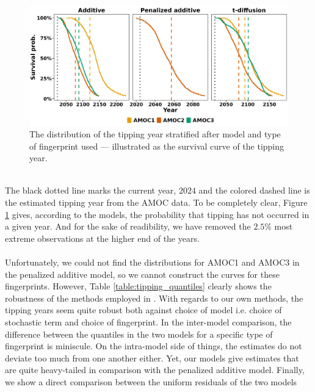 \begin{figure}[h!]
    \begin{center}
        \includegraphics[scale = .096]{figures/surival_curve_first97.5.jpeg}
        \caption{The distribution of the tipping year stratified after model and type of fingerprint used — illustrated as the survival curve of the tipping year.}
        \label{figure:surival_curve_taus}
    \end{center}
\end{figure}\\
The black dotted line marks the current year, $2024$ and the colored dashed line is the estimated tipping year from the AMOC data. To be completely clear, Figure \ref{figure:surival_curve_taus} gives, according to the models, the probability that tipping has not occurred in a given year. And for the sake of readibility, we have removed the $2.5\%$ most extreme observations at the higher end of the years.\\\\
Unfortunately, we could not find the distributions for AMOC1 and AMOC3 in the penalized additive model, so we cannot construct the curves for these fingerprints. However, Table \ref{table:tipping_quantiles} clearly shows the robustness of the methods employed in \cite{Ditlevsen2023}. With regards to our own methods, the tipping years seem quite robust both against choice of model i.e. choice of stochastic term and choice of fingerprint. In the inter-model comparison, the difference between the quantiles in the two models for a specific type of fingerprint is miniscule. On the intra-model side of things, the estimates do not deviate too much from one another either. Yet, our models give estimates that are quite heavy-tailed in comparison with the penalized additive model.
\newpage
\noindent Finally, we show a direct comparison between the uniform residuals of the two models

